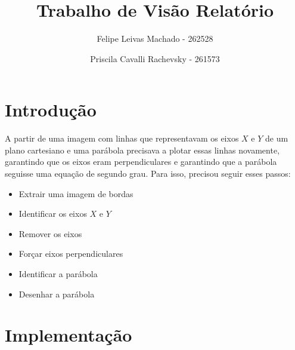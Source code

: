 \documentclass{article}
\title{Trabalho de Visão Relatório}
\author{Felipe Leivas Machado - 262528 \and Priscila Cavalli Rachevsky - 261573 }
\begin{document}
\maketitle

\section{Introdução}
    A partir de uma imagem com linhas que representavam os eixos \(X\) e \(Y\) de um plano cartesiano e uma parábola precisava a plotar essas linhas novamente, garantindo que os eixos eram perpendiculares e garantindo que a parábola seguisse uma equação de segundo grau. Para isso, precisou seguir esses passos:
   \begin{itemize}
       \item Extrair uma imagem de bordas
       \item Identificar os eixos \(X\) e \(Y\)
       \item Remover os eixos
       \item Forçar eixos perpendiculares 
       \item Identificar a parábola
       \item Desenhar a parábola
   \end{itemize}
\section{Implementação}
\end{document}
